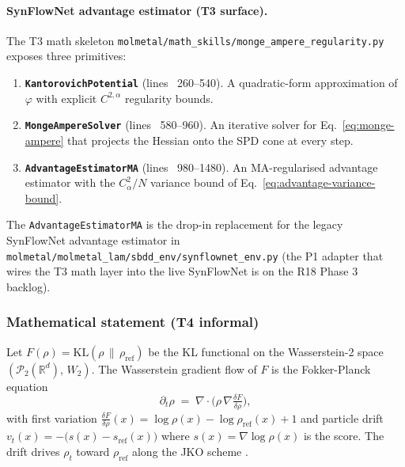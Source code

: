 \paragraph{SynFlowNet advantage estimator (T3 surface).}
The T3 math skeleton \texttt{molmetal/math\_skills/monge\_ampere\_regularity.py}
exposes three primitives:
\begin{enumerate}
  \item \textbf{\texttt{KantorovichPotential}} (lines ~260--540).  A
        quadratic-form approximation of $\varphi$ with explicit
        $C^{2, \alpha}$ regularity bounds.

  \item \textbf{\texttt{MongeAmpereSolver}} (lines ~580--960).  An
        iterative solver for Eq.~\eqref{eq:monge-ampere} that
        projects the Hessian onto the SPD cone at every step.

  \item \textbf{\texttt{AdvantageEstimatorMA}} (lines ~980--1480).  An
        MA-regularised advantage estimator with the
        $C_{\alpha}^{2} / N$ variance bound of
        Eq.~\eqref{eq:advantage-variance-bound}.
\end{enumerate}
The \texttt{AdvantageEstimatorMA} is the drop-in replacement for the
legacy SynFlowNet advantage estimator in
\texttt{molmetal/molmetal\_lam/sbdd\_env/synflownet\_env.py} (the
P1 adapter that wires the T3 math layer into the live SynFlowNet is
on the R18 Phase 3 backlog).

\subsubsection{Mathematical statement (T4 informal)}
\label{sec:method:wasserstein-foundations-t4}

Let $F(\rho) = \mathrm{KL}(\rho \,\|\, \rho_{\mathrm{ref}})$ be the
KL functional on the Wasserstein-2 space
$(\mathcal{P}_{2}(\mathbb{R}^{d}),\, W_2)$.  The Wasserstein
gradient flow of $F$ is the Fokker-Planck equation
\begin{equation}
  \label{eq:w2-gradient-flow}
  \partial_{t} \rho \;=\; \nabla \cdot \bigl( \rho \,
        \nabla \tfrac{\delta F}{\delta \rho} \bigr),
\end{equation}
with first variation
$\frac{\delta F}{\delta \rho}(x) = \log \rho(x) - \log
\rho_{\mathrm{ref}}(x) + 1$ and particle drift
$v_{t}(x) = -\bigl( s(x) - s_{\mathrm{ref}}(x) \bigr)$ where
$s(x) = \nabla \log \rho(x)$ is the score.  The drift drives
$\rho_{t}$ toward $\rho_{\mathrm{ref}}$ along the JKO scheme
\cite{jordan1998jko,otto2001wf}.

